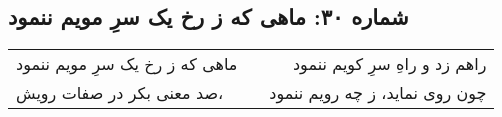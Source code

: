 \begin{center}
\section*{شماره ۳۰: ماهی که ز رخ یک سرِ مویم ننمود}
\label{sec:030}
\begin{longtable}{l p{0.5cm} r}
ماهی که ز رخ یک سرِ مویم ننمود
&&
راهم زد و راهِ سرِ کویم ننمود
\\
صد معنی بکر در صفات رویش،
&&
چون روی نماید، ز چه رویم ننمود
\\
\end{longtable}
\end{center}
